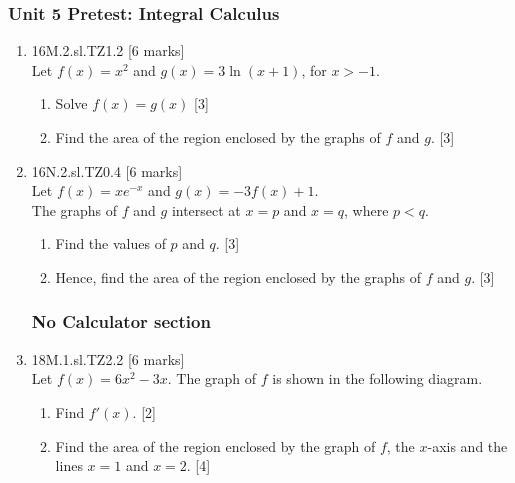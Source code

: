 \documentclass[12pt, twoside]{article}
\begin{document}
\subsubsection*{Unit 5 Pretest: Integral Calculus}
 \begin{enumerate}

\subsubsection*{Using the calculator for definite integrals}

   \item 16M.2.sl.TZ1.2 \hfill [6 marks]\\
   Let $f(x)=x^2$ and $g(x)=3 \ln (x+1)$, for $x>-1$.
   \begin{enumerate}
     \item Solve $f(x)=g(x)$ \hfill [3]
     \item Find the area of the region enclosed by the graphs of $f$ and $g$. \hfill [3]
   \end{enumerate}


   \item 16N.2.sl.TZ0.4 \hfill [6 marks]\\
   Let $f(x)=xe^{-x}$ and $g(x)=-3f(x)+1$.\\
   The graphs of $f$ and $g$ intersect at $x=p$ and $x=q$, where $p<q$.
   \begin{enumerate}
     \item Find the values of $p$ and $q$. \hfill [3]
     \item Hence, find the area of the region enclosed by the graphs of $f$ and $g$. \hfill [3]
   \end{enumerate}

\subsubsection*{No Calculator section}

  \item 18M.1.sl.TZ2.2 \hfill [6 marks]\\
  Let $f(x)=6x^2-3x$. The graph of $f$ is shown in the following diagram.
    \begin{center}
    \end{center}
    \begin{enumerate}
      \item Find $f'(x)$. \hfill [2]
      \item Find the area of the region enclosed by the graph of $f$, the $x$-axis and the lines $x = 1$ and $x = 2$. \hfill [4]
    \end{enumerate}


\end{enumerate}
\end{document}
